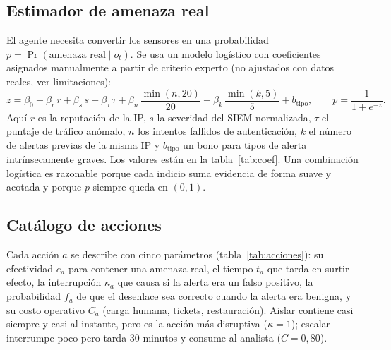 \documentclass[11pt,a4paper]{article}
\begin{document}
\subsection{Estimador de amenaza real}

El agente necesita convertir los sensores en una probabilidad $p=\Pr(\text{amenaza real}\mid o_t)$. Se usa un modelo logístico con coeficientes asignados manualmente a partir de criterio experto (no ajustados con datos reales, ver limitaciones):
\begin{equation}
z=\beta_0+\beta_r\,r+\beta_s\,s+\beta_\tau\,\tau+\beta_n\,\frac{\min(n,20)}{20}+\beta_k\,\frac{\min(k,5)}{5}+b_{\text{tipo}},\qquad
p=\frac{1}{1+e^{-z}}.
\end{equation}
Aquí $r$ es la reputación de la IP, $s$ la severidad del SIEM normalizada, $\tau$ el puntaje de tráfico anómalo, $n$ los intentos fallidos de autenticación, $k$ el número de alertas previas de la misma IP y $b_{\text{tipo}}$ un bono para tipos de alerta intrínsecamente graves. Los valores están en la tabla~\ref{tab:coef}. Una combinación logística es razonable porque cada indicio suma evidencia de forma suave y acotada y porque $p$ siempre queda en $(0,1)$.

\begin{table}[H]
\centering
\caption{Coeficientes del estimador de amenaza.}\label{tab:coef}
\small

\end{table}

\subsection{Catálogo de acciones}

Cada acción $a$ se describe con cinco parámetros (tabla~\ref{tab:acciones}): su efectividad $e_a$ para contener una amenaza real, el tiempo $t_a$ que tarda en surtir efecto, la interrupción $\kappa_a$ que causa si la alerta era un falso positivo, la probabilidad $f_a$ de que el desenlace sea correcto cuando la alerta era benigna, y su costo operativo $C_a$ (carga humana, tickets, restauración). Aislar contiene casi siempre y casi al instante, pero es la acción más disruptiva ($\kappa=1$); escalar interrumpe poco pero tarda 30 minutos y consume al analista ($C=0{,}80$).

\begin{table}[H]
\centering
\caption{Parámetros del catálogo de acciones.}\label{tab:acciones}
\small

\end{table}
\end{document}
